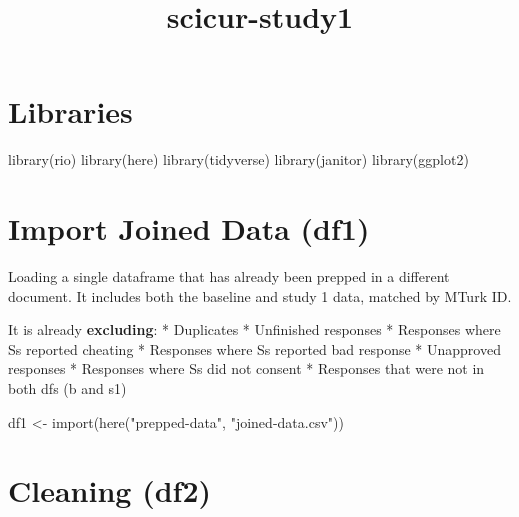 \documentclass[
]{article}
\title{scicur-study1}
\author{}
\date{\vspace{-2.5em}}
\newenvironment{Shaded}{\begin{snugshade}}{\end{snugshade}}
\newcommand{\FunctionTok}[1]{\textcolor[rgb]{0.00,0.00,0.00}{#1}}
\newcommand{\NormalTok}[1]{#1}
\newcommand{\OtherTok}[1]{\textcolor[rgb]{0.56,0.35,0.01}{#1}}
\newcommand{\StringTok}[1]{\textcolor[rgb]{0.31,0.60,0.02}{#1}}
\begin{document}
\maketitle

\hypertarget{libraries}{%
\section{Libraries}\label{libraries}}

\begin{Shaded}
\begin{Highlighting}[]
\FunctionTok{library}\NormalTok{(rio)}
\FunctionTok{library}\NormalTok{(here)}
\FunctionTok{library}\NormalTok{(tidyverse)}
\FunctionTok{library}\NormalTok{(janitor)}
\FunctionTok{library}\NormalTok{(ggplot2)}
\end{Highlighting}
\end{Shaded}

\hypertarget{import-joined-data-df1}{%
\section{Import Joined Data (df1)}\label{import-joined-data-df1}}

Loading a single dataframe that has already been prepped in a different
document. It includes both the baseline and study 1 data, matched by
MTurk ID.

It is already \textbf{excluding}: * Duplicates * Unfinished responses *
Responses where Ss reported cheating * Responses where Ss reported bad
response * Unapproved responses * Responses where Ss did not consent *
Responses that were not in both dfs (b and s1)

\begin{Shaded}
\begin{Highlighting}[]
\NormalTok{df1 }\OtherTok{\textless{}{-}} \FunctionTok{import}\NormalTok{(}\FunctionTok{here}\NormalTok{(}\StringTok{"prepped{-}data"}\NormalTok{, }\StringTok{"joined{-}data.csv"}\NormalTok{))}
\end{Highlighting}
\end{Shaded}

\hypertarget{cleaning-df2}{%
\section{Cleaning (df2)}\label{cleaning-df2}}
\end{document}
